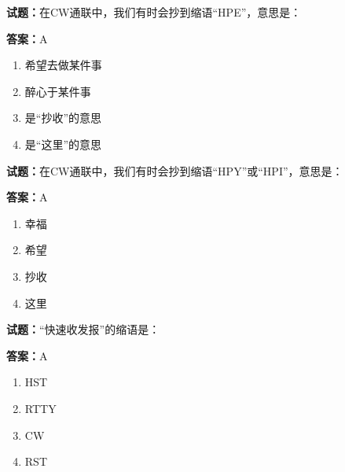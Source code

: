 \documentclass{ctexbook}
\begin{document}




\vspace{1em}

\textbf{试题：}在CW通联中，我们有时会抄到缩语“HPE”，意思是： 

\textbf{答案：}A 

\begin{enumerate}[leftmargin=3em]
  \item 希望去做某件事 

  \item 醉心于某件事 


  \item 是“抄收”的意思 

  \item 是“这里”的意思 

\end{enumerate}





\vspace{1em}

\textbf{试题：}在CW通联中，我们有时会抄到缩语“HPY”或“HPI”，意思是： 

\textbf{答案：}A 

\begin{enumerate}[leftmargin=3em]
  \item 幸福 

  \item 希望 

  \item 抄收 

  \item 这里 

\end{enumerate}





\vspace{1em}

\textbf{试题：}“快速收发报”的缩语是： 

\textbf{答案：}A 

\begin{enumerate}[leftmargin=3em]
  \item HST 

  \item RTTY 

  \item CW 

  \item RST 

\end{enumerate}
\end{document}
